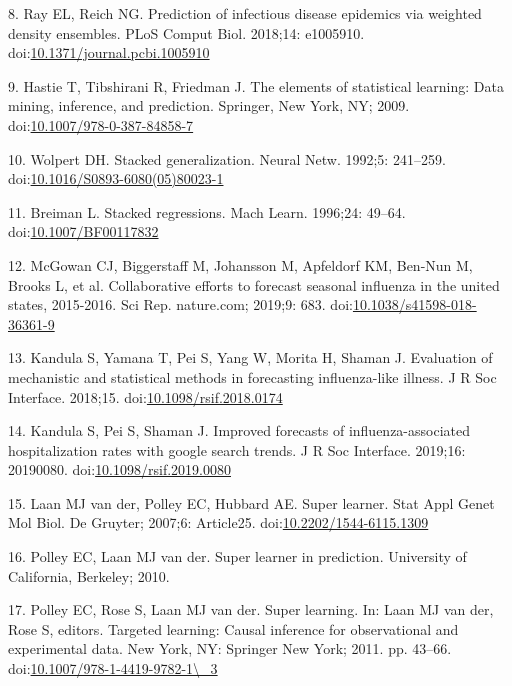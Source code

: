 \documentclass[10pt,letterpaper]{article}
\begin{document}
\leavevmode\hypertarget{ref-Ray2018-ef}{}%
8. Ray EL, Reich NG. Prediction of infectious disease epidemics via
weighted density ensembles. PLoS Comput Biol. 2018;14: e1005910.
doi:\href{https://doi.org/10.1371/journal.pcbi.1005910}{10.1371/journal.pcbi.1005910}

\leavevmode\hypertarget{ref-Hastie2009-ft}{}%
9. Hastie T, Tibshirani R, Friedman J. The elements of statistical
learning: Data mining, inference, and prediction. Springer, New York,
NY; 2009.
doi:\href{https://doi.org/10.1007/978-0-387-84858-7}{10.1007/978-0-387-84858-7}

\leavevmode\hypertarget{ref-Wolpert1992-pw}{}%
10. Wolpert DH. Stacked generalization. Neural Netw. 1992;5: 241--259.
doi:\href{https://doi.org/10.1016/S0893-6080(05)80023-1}{10.1016/S0893-6080(05)80023-1}

\leavevmode\hypertarget{ref-Breiman1996-ez}{}%
11. Breiman L. Stacked regressions. Mach Learn. 1996;24: 49--64.
doi:\href{https://doi.org/10.1007/BF00117832}{10.1007/BF00117832}

\leavevmode\hypertarget{ref-McGowan2019-ph}{}%
12. McGowan CJ, Biggerstaff M, Johansson M, Apfeldorf KM, Ben-Nun M,
Brooks L, et al. Collaborative efforts to forecast seasonal influenza in
the united states, 2015-2016. Sci Rep. nature.com; 2019;9: 683.
doi:\href{https://doi.org/10.1038/s41598-018-36361-9}{10.1038/s41598-018-36361-9}

\leavevmode\hypertarget{ref-Kandula2018-sq}{}%
13. Kandula S, Yamana T, Pei S, Yang W, Morita H, Shaman J. Evaluation
of mechanistic and statistical methods in forecasting influenza-like
illness. J R Soc Interface. 2018;15.
doi:\href{https://doi.org/10.1098/rsif.2018.0174}{10.1098/rsif.2018.0174}

\leavevmode\hypertarget{ref-Kandula2019-tg}{}%
14. Kandula S, Pei S, Shaman J. Improved forecasts of
influenza-associated hospitalization rates with google search trends. J
R Soc Interface. 2019;16: 20190080.
doi:\href{https://doi.org/10.1098/rsif.2019.0080}{10.1098/rsif.2019.0080}

\leavevmode\hypertarget{ref-Van_der_Laan2007-ml}{}%
15. Laan MJ van der, Polley EC, Hubbard AE. Super learner. Stat Appl
Genet Mol Biol. De Gruyter; 2007;6: Article25.
doi:\href{https://doi.org/10.2202/1544-6115.1309}{10.2202/1544-6115.1309}

\leavevmode\hypertarget{ref-Polley2010-cb}{}%
16. Polley EC, Laan MJ van der. Super learner in prediction. University
of California, Berkeley; 2010.

\leavevmode\hypertarget{ref-Polley2011-oz}{}%
17. Polley EC, Rose S, Laan MJ van der. Super learning. In: Laan MJ van
der, Rose S, editors. Targeted learning: Causal inference for
observational and experimental data. New York, NY: Springer New York;
2011. pp. 43--66.
doi:\href{https://doi.org/10.1007/978-1-4419-9782-1/_3}{10.1007/978-1-4419-9782-1\textbackslash{}\_3}
\end{document}
